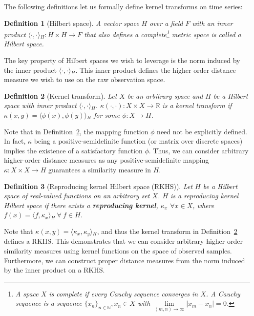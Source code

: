 \documentclass[a4paper]{article}
\newcommand{\innerproduct}[2]{\langle{}#1,#2\rangle{}}
\theoremstyle{def}
\newtheorem{definition}{Definition}
\theoremstyle{thm}
\newcommand{\R}[0]{\mathbb{R}}
\newcommand{\N}[0]{\mathbb{N}}
\begin{document}
The following definitions let us formally define kernel transforms on time series:

\begin{definition}[Hilbert space]\label{defn:hilbert_space}
    A vector space $H$ over a field $F$ with an inner product $\innerproduct{\cdot}{\cdot}_H: H \times H \rightarrow F$ that also defines a complete\footnote{A space $X$ is complete if every Cauchy sequence  converges in $X$. A Cauchy sequence is a sequence ${\{x_n\}}_{n \in \N}, x_n \in X$ with $\lim\limits_{(m,n)\rightarrow\infty} |x_m - x_n| = 0$.} metric space is called a Hilbert space.
\end{definition}

The key property of Hilbert spaces we wish to leverage is the norm induced by the inner product $\innerproduct{\cdot}{\cdot}_H$.
This inner product defines the higher order distance measure we wish to use on the raw observation space.

\begin{definition}[Kernel transform]\label{defn:kernel_trick}
    Let $X$ be an arbitrary space and $H$ be a Hilbert space with inner product $\innerproduct{\cdot}{\cdot}_H$.
    $\kappa(\cdot, \cdot): X \times X \rightarrow \R$ is a kernel transform if $\kappa(x,y) = \innerproduct{\phi(x)}{\phi(y)}_H$ for some $\phi: X \rightarrow H$.
\end{definition}

Note that in Definition~\ref{defn:kernel_trick}, the mapping function $\phi$ need not be explicitly defined.
In fact, $\kappa$ being a positive-semidefinite function (or matrix over discrete spaces) implies the existence of a satisfactory function $\phi$.
Thus, we can consider arbitrary higher-order distance measures as any positive-semidefinite mapping $\kappa: X \times X \rightarrow H$ guarantees a similarity measure in $H$.

\begin{definition}[Reproducing kernel Hilbert space (RKHS)]\label{defn:rkhs}
    Let $H$ be a Hilbert space of real-valued functions on an arbitrary set $X$.
    $H$ is a reproducing kernel Hilbert space if there exists a \textbf{reproducing kernel}, $\kappa_x$ $\forall x \in X$, where $f(x) = \innerproduct{f}{\kappa_x}_H~\forall~f \in H$.
\end{definition}

Note that $\kappa(x,y) = \innerproduct{\kappa_x}{\kappa_y}_H$, and thus the kernel transform in Definition~\ref{defn:kernel_trick} defines a RKHS.\@
This demonstrates that we can consider arbitrary higher-order similarity measures using kernel functions on the space of observed samples.
Furthermore, we can construct proper distance measures from the norm induced by the inner product on a RKHS.\@
\end{document}
